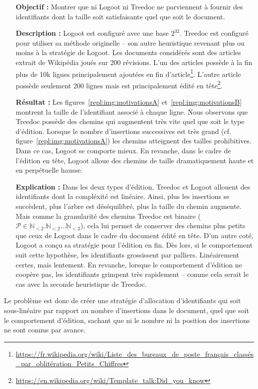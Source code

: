 \begin{itemize}
\item [\textbf{Objectif :}] Montrer que ni Logoot ni Treedoc ne parviennent à
  fournir des identifiants dont la taille soit satisfaisante quel que soit le
  document.
\item [\textbf{Description :}] Logoot est configuré avec une base
  $2^{32}$. Treedoc est configuré pour utiliser sa méthode originelle -- son
  autre heuristique revenant plus ou moins à la stratégie de Logoot. Les
  documents considérés sont des articles extrait de Wikipédia joués sur 200
  révisions. L'un des articles possède à la fin plus de 10k lignes
  principalement ajoutées en fin
  d'article\footnote{\url{https://fr.wikipedia.org/wiki/Liste_des_bureaux_de_poste_français_classés_par_oblitération_Petits_Chiffres}}. L'autre
  article possède seulement 200 lignes mais est principalement édité en
  tête\footnote{\url{https://en.wikipedia.org/wiki/Template_talk:Did_you_know}}.
\item [\textbf{Résultat :}] Les figures~\ref{repl:img:motivationsA}
  et~\ref{repl:img:motivationsB} montrent la taille de l'identifiant associé à
  chaque ligne. Nous observons que Treedoc possède des chemins qui augmentent
  très vite quel que soit le type d'édition. Lorsque le nombre d'insertions
  successives est très grand (cf. figure~\ref{repl:img:motivationsA}) les
  chemins atteignent des tailles prohibitives. Dans ce cas, Logoot se comporte
  mieux. En revanche, dans le cadre de l'édition en tête, Logoot alloue des
  chemins de taille dramatiquement haute et en perpétuelle hausse.
\item [\textbf{Explication :}] Dans les deux types d'édition, Treedoc et Logoot
  allouent des identifiants dont la compléxité est linéaire. Ainsi, plus les
  insertions se succèdent, plus l'arbre est déséquilibré, plus la taille du
  chemin augmente. Mais comme la granularité des chemins Treedoc est binaire
  ($\mathcal{P}\in \mathbb{N}_{<2}.\mathbb{N}_{<2}\ldots\mathbb{N}_{<2}$), cela
  lui permet de conserver des chemins plus petits que ceux de Logoot dans le
  cadre du document édité en tête. D'un autre coté, Logoot a conçu sa stratégie
  pour l'édition en fin. Dès lors, si le comportement suit cette hypothèse, les
  identifiants grossissent par palliers. Linéairement certes, mais lentement. En
  revanche, lorsque le comportement d'édition ne coopère pas, les identifiants
  grimpent très rapidement -- comme cela serait le cas avec la seconde
  heuristique de Treedoc.
\end{itemize}

Le problème est donc de créer une stratégie d'allocation d'identifiants qui soit
sous-linéaire par rapport au nombre d'insertions dans le document, quel que soit
le comportement d'édition, sachant que ni le nombre ni la position des
insertions ne sont connus par avance. 

